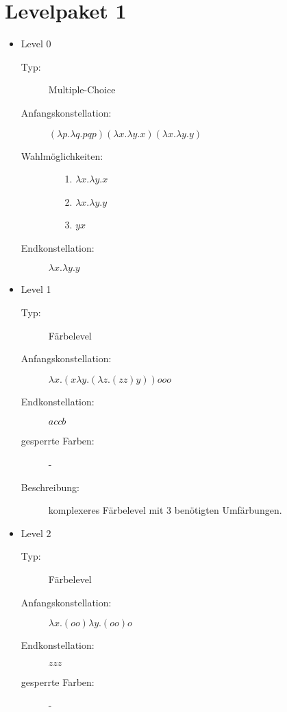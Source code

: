 \section{Levelpaket 1}
\begin{itemize}

	\item{Level 0}
		\begin{description}
			\item[Typ:] Multiple-Choice 
			\item[Anfangskonstellation:] \((\lambda p .\lambda q . p q p ) (\lambda x . \lambda y . x ) (\lambda x . \lambda y . y )  \)    
			\item[Wahlmöglichkeiten:] \hfill
				\begin{itemize}
					\item[1.] \(\lambda x . \lambda y . x \) 
					\item[2.] \(\lambda x . \lambda y . y \)
					\item[3.] \( y x \)
				\end{itemize}
			\item[Endkonstellation:]\(\lambda x . \lambda y . y \)
		\end{description}

	\item{Level 1}
		\begin{description} 
		\item[Typ:] Färbelevel 
		\item[Anfangskonstellation:] \(\lambda x . ( x \lambda y .  ( \lambda z . (z z) y )  )  o o o\)   
		\item[Endkonstellation:] \(a c c b\) 
		\item[gesperrte Farben:] -
		\item[Beschreibung:] komplexeres Färbelevel mit 3 benötigten Umfärbungen. 

		\end{description}
	
	\item{Level 2}
		\begin{description}
			\item[Typ:] Färbelevel
			\item[Anfangskonstellation:] \( \lambda x . ( o o ) \lambda y . ( o o ) o \)    
			\item[Endkonstellation:] \(z z z\)
			\item[gesperrte Farben:] -
		\end{description}


\end{itemize}
